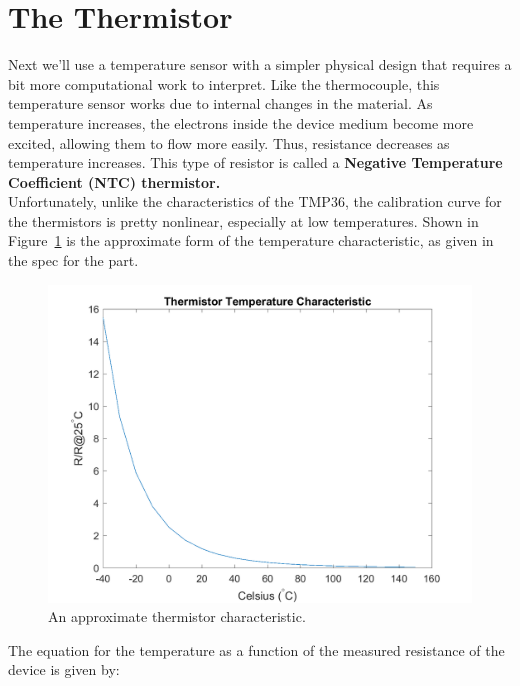 \documentclass[12pt]{article}
\begin{document}
    \newpage
    \section*{The Thermistor}
    
	Next we'll use a temperature sensor with a simpler physical design that requires a bit more computational work to interpret. Like the thermocouple, this temperature sensor works due to internal changes in the material. As temperature increases, the electrons inside the device medium become more excited, allowing them to flow more easily. Thus, resistance decreases as temperature increases. This type of resistor is called a \textbf{Negative Temperature Coefficient (NTC) thermistor.} \\
    
    Unfortunately, unlike the characteristics of the TMP36, the calibration curve for the thermistors is pretty nonlinear, especially at low temperatures. Shown in Figure~\ref{fig:thermistor} is the approximate form of the temperature characteristic, as given in the spec for the part.\\
    
    \begin{figure}[h]
    	\begin{center}
        	\includegraphics[scale=0.48]{Figures/therm_charac.png}
            \caption{An approximate thermistor characteristic.}
            \label{fig:thermistor}
         \end{center}
    \end{figure}
    
    The equation for the temperature as a function of the measured resistance of the device is given by:
    
\end{document}
